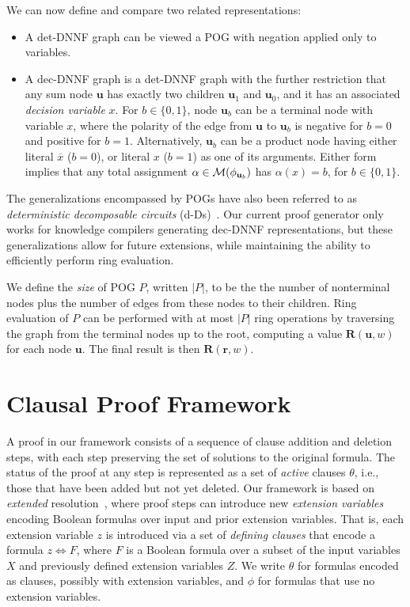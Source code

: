 \documentclass[twoside,11pt]{article}
\newcommand{\obar}[1]{\overline{#1}}
\newcommand{\varset}{X}
\newcommand{\exvarset}{Z}
\newcommand{\rep}{\textbf{R}}
\newcommand{\ifandonlyif}{\Leftrightarrow}
\newcommand{\assign}{\alpha}
\newcommand{\modelset}{{\cal M}}
\newcommand{\makenode}[1]{\mathbf{#1}}
\newcommand{\nodeu}{\makenode{u}}
\newcommand{\noder}{\makenode{r}}
\begin{document}
We can now define and compare two related representations:
\begin{itemize}
\item A det-DNNF graph can be viewed a POG with negation applied only to variables.
\item A dec-DNNF graph is a det-DNNF graph with the further
  restriction that any sum node $\nodeu$ has exactly two children
  $\nodeu_1$ and $\nodeu_0$, and it has an associated \emph{decision variable} $x$.
  For $b \in \{0,1\}$, node $\nodeu_b$ can be a terminal node with variable $x$, where the polarity of the edge from $\nodeu$ to $\nodeu_b$ is
  negative for $b=0$ and positive for $b=1$.
  Alternatively, $\nodeu_b$ can be a product node having either literal $\obar{x}$ ($b=0$), or literal $x$ ($b=1$) as one of its arguments.
  Either form implies that any total assignment $\assign \in \modelset(\phi_{\nodeu_b})$
  has $\assign(x)=b$, for $b \in \{0,1\}$.
\end{itemize}
The generalizations encompassed by POGs have also been referred to as \emph{deterministic decomposable circuits} (d-Ds)~\cite{monet:amw:2018}.
Our current proof generator only works for knowledge compilers
generating dec-DNNF representations, but these generalizations
allow for future extensions, while maintaining the ability to
efficiently perform ring evaluation.


We define the \emph{size} of POG $P$, written $|P|$, to be the
the number of nonterminal nodes plus the number of edges from these nodes to their children.  Ring
evaluation of $P$ can be performed with at most $|P|$ ring
operations by traversing the graph from the terminal nodes up to
the root, computing a value $\rep(\nodeu, w)$ for each node $\nodeu$.
The final result is then $\rep(\noder, w)$.


\section{Clausal Proof Framework}
\label{sect:clausal}

A proof in our framework consists of a sequence of clause addition and
deletion steps, with each step preserving the set of solutions to the
original formula.  The status of the proof at any step is represented
as a set of \emph{active} clauses $\theta$, i.e., those that have been
added but not yet deleted.  Our framework is based on \emph{extended}
resolution~\cite{Tseitin:1983}, where proof steps can introduce new
\emph{extension variables} encoding Boolean formulas over input and
prior extension variables.  That is, each extension variable $z$ is
introduced via a set of \emph{defining clauses} that encode a formula
$z \ifandonlyif F$, where $F$ is a Boolean formula over a subset of the input
variables $\varset$ and previously defined extension variables $\exvarset$.
We write $\theta$ for
formulas encoded as clauses, possibly with extension variables, and
$\phi$ for formulas
that use no extension variables.
\end{document}
